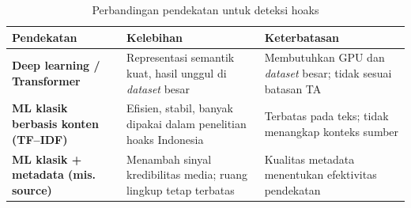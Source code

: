 \begin{table}[h!]
    \begin{tabular}{| p{} | p{} | p{} |}
    \hline
    \textbf{Pendekatan} 
    & \textbf{Kelebihan} 
    & \textbf{Keterbatasan} \\
    \hline

    \textbf{Deep learning / Transformer} 
    & Representasi semantik kuat, hasil unggul di \textit{dataset} besar	 
    & Membutuhkan GPU dan \textit{dataset} besar; tidak sesuai batasan TA \\
    \hline

    \textbf{ML klasik berbasis konten (TF–IDF)} 
    & Efisien, stabil, banyak dipakai dalam penelitian hoaks Indonesia	 
    & Terbatas pada teks; tidak menangkap konteks sumber \\
    \hline

    \textbf{ML klasik + metadata (mis. source)} 
    & Menambah sinyal kredibilitas media; ruang lingkup tetap terbatas
    & Kualitas metadata menentukan efektivitas pendekatan \\
    \hline
    \end{tabular}
\caption{Perbandingan pendekatan untuk deteksi hoaks}
\label{tbl:perbandingan-pendekatan}
\end{table}



